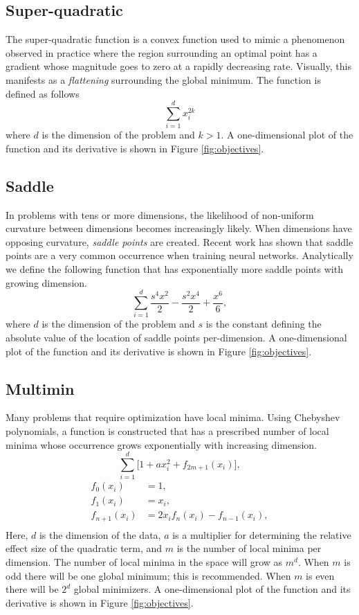 \documentclass[letterpaper, 10 pt, conference]{IEEEtran}  %
\begin{document}
\subsection{Super-quadratic}

The super-quadratic function is a convex function used to mimic a
phenomenon observed in practice where the region surrounding an
optimal point has a gradient whose magnitude goes to zero at a rapidly
decreasing rate.  Visually, this manifests as a \textit{flattening}
surrounding the global minimum.  The function is defined as follows
$$ \sum_{i=1}^{d} x_i^{2k} $$
where $d$ is the dimension of the problem and $k > 1$.  A
one-dimensional plot of the function and its derivative is shown in
Figure \ref{fig:objectives}.

\subsection{Saddle}

In problems with tens or more dimensions, the likelihood of
non-uniform curvature between dimensions becomes increasingly likely.
When dimensions have opposing curvature, {\it saddle points} are
created.  Recent work \cite{dauphin2014identifying} has shown that
saddle points are a very common occurrence when training neural
networks.  Analytically we define the following function that has
exponentially more saddle points with growing dimension.
$$ \sum_{i=1}^{d} \frac{s^4 x^2}{2} - \frac{s^2 x^4}{2} + \frac{x^6}{6}, $$
where $d$ is the dimension of the problem and $s$ is the constant
defining the absolute value of the location of saddle points
per-dimension.  A one-dimensional plot of the function and its
derivative is shown in Figure \ref{fig:objectives}.

\subsection{Multimin}

Many problems that require optimization have local minima. Using
Chebyshev polynomials, a function is constructed that has a prescribed
number of local minima whose occurrence grows exponentially with
increasing dimension.
$$ \sum_{i=1}^{d} \big [  1 + a x_i^2 + f_{2m + 1}(x_i) \big ], $$
\begin{align*}
  f_0(x_i) &= 1, \\
  f_1(x_i) &= x_i, \\
  f_{n+1}(x_i) &= 2 x_i f_{n}(x_i) - f_{n-1}(x_i), \\
\end{align*}
Here, $d$ is the dimension of the data, $a$ is a multiplier for
determining the relative effect size of the quadratic term, and $m$ is
the number of local minima per dimension. The number of local minima
in the space will grow as $m^d$. When $m$ is odd there will be one
global minimum; this is recommended.  When $m$ is even there will be
$2^d$ global minimizers. A one-dimensional plot of the function and
its derivative is shown in Figure \ref{fig:objectives}.
\end{document}
